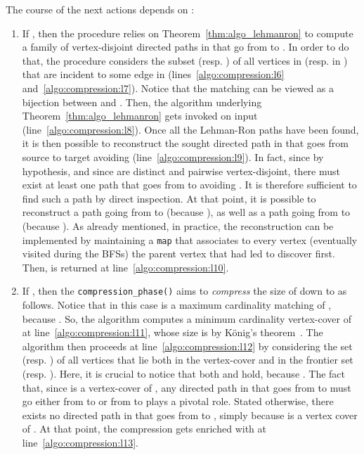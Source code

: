 The course of the next actions depends on
:

\begin{enumerate}
\item
If ,
then the procedure relies on Theorem~\ref{thm:algo_lehmanron}
to compute a family  of 
vertex-disjoint directed paths in  that go from  to .
In order to do that, the procedure considers the subset  (resp. ) of all vertices in  (resp. in )
that are
incident
to some edge in  (lines~\ref{algo:compression:l6} and~\ref{algo:compression:l7}).
Notice that the matching  can be viewed as a bijection between  and .
Then, the algorithm underlying Theorem~\ref{thm:algo_lehmanron}
gets invoked on input  (line~\ref{algo:compression:l8}).
Once all the Lehman-Ron paths  have been
found,
it is then possible to reconstruct the sought directed path  in  that goes from
source  to target   avoiding  (line~\ref{algo:compression:l9}).
In fact, since  by hypothesis, and since 
are distinct and pairwise vertex-disjoint,
there must exist at least one path  that goes from  to   avoiding .
It is therefore sufficient to find such a path  by direct inspection.
At that point, it is possible to reconstruct a path  going from  to  (because ),
as well as a path going from  to  (because ).
As already mentioned, in practice, the reconstruction can be implemented by maintaining a \texttt{map}
that associates to every vertex  (eventually visited during the BFSs)
the parent vertex that had led to discover  first.
Then,  is returned at line~\ref{algo:compression:l10}.

\item
If , then the \texttt{compression\_phase()}
aims to \emph{compress} the size of  down to 
as follows. Notice that in this case
 is a maximum cardinality matching of , because .
So, the algorithm computes a minimum cardinality
vertex-cover  of  at line~\ref{algo:compression:l11},
whose size is  by K\"{o}nig's theorem~\cite{Diestel2005}.
The algorithm then proceeds at line~\ref{algo:compression:l12} by considering the set  (resp. )
of all vertices that lie both in the vertex-cover  and in the frontier set  (resp. ).
Here, it is crucial to notice that both
 and  hold,
because .
The fact that, since  is a vertex-cover of ,
any directed path in  that goes from  to  must go either from
 to  or from  to  plays a pivotal role. Stated otherwise,
there exists no directed path in  that goes from  to ,
simply because  is a vertex cover of .
At that point, the compression  gets enriched with
 at line~\ref{algo:compression:l13}.


\end{enumerate}
